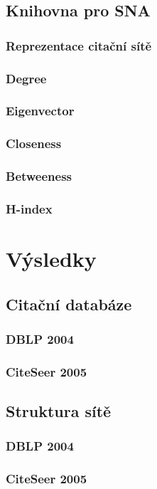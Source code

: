 \documentclass[12pt]{article}
\begin{document}
\subsection{Knihovna pro SNA}

\subsubsection{Reprezentace citační sítě}
\subsubsection{Degree}
\subsubsection{Eigenvector}
\subsubsection{Closeness}
\subsubsection{Betweeness}
\subsubsection{H-index}

\section{Výsledky}
\subsection{Citační databáze}
\subsubsection{DBLP 2004}
\subsubsection{CiteSeer 2005}

\subsection{Struktura sítě}
\subsubsection{DBLP 2004}
\subsubsection{CiteSeer 2005}
\end{document}
